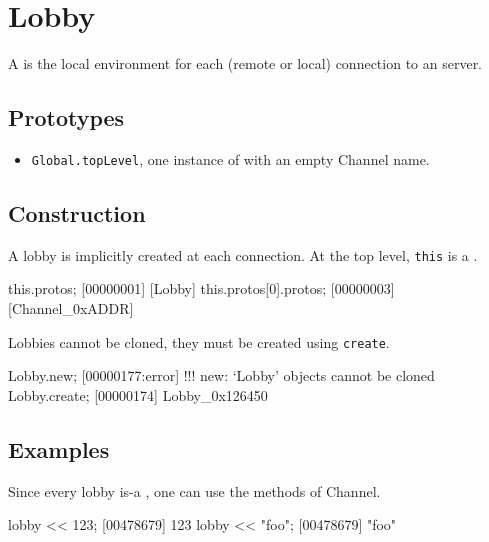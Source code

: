 \section{Lobby}

A  is the local environment for each (remote or local)
connection to an \urbi server.

\subsection{Prototypes}
\begin{itemize}
\item \lstinline|Global.topLevel|, one instance of 
  with an empty Channel name.
\end{itemize}

\subsection{Construction}

A lobby is implicitly created at each connection. At the top level,
\lstinline|this| is a .

\begin{urbiscript}[firstnumber=last]
this.protos;
[00000001] [Lobby]
this.protos[0].protos;
[00000003] [Channel_0xADDR]
\end{urbiscript}

Lobbies cannot be cloned, they must be created using
\lstinline|create|.

\begin{urbiscript}[firstnumber=last]
Lobby.new;
[00000177:error] !!! new: `Lobby' objects cannot be cloned
Lobby.create;
[00000174] Lobby_0x126450
\end{urbiscript}


\subsection{Examples}

Since every lobby is-a , one can use the methods of
Channel.

\begin{urbiscript}[firstnumber=last]
lobby << 123;
[00478679] 123
lobby << "foo";
[00478679] "foo"
\end{urbiscript}


